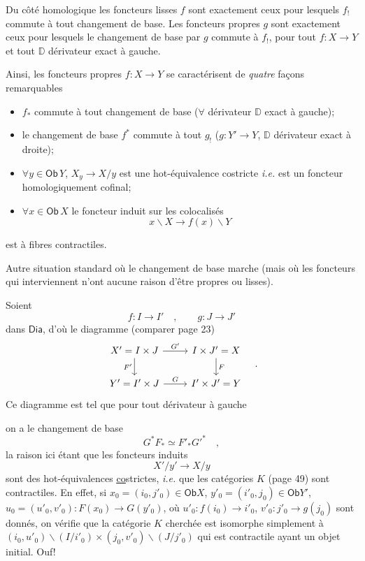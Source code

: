 \documentclass[11pt]{article}
\newcommand{\printedpage}[1]{\marginpar{\footnotesize p.~#1}}
\newcommand{\msp}[1]{\marginpar{\footnotesize [#1]}}
\newcommand{\Ob}{\mathsf{Ob}}
\newcommand{\Dia}{\mathsf{Dia}}
\newcommand{\DD}{\mathbb{D}}
\begin{document}
\noindent Du côté homologique les foncteurs lisses $f$ sont exactement ceux pour lesquels $f_!$ commute à tout changement de base. Les foncteurs propres $g$ sont exactement ceux pour lesquels le changement de base par $g$ commute à $f_!$, pour tout $f : X \to Y$ et tout $\DD$ dérivateur exact à gauche.

\noindent\msp{page 59}
Ainsi, les foncteurs propres $f : X \to Y$ se caractérisent de \textit{quatre} façons remarquables
\begin{itemize}[label={}, leftmargin=0pt, itemindent=2\parindent, labelsep=0.3em]
\item[\textit{a})] $f_*$ commute à tout changement de base ($\forall$ dérivateur $\DD$ exact à gauche);
\item[\textit{b})] le changement de base $f^*$ commute à tout $g_!$ ($g : Y' \to Y$, $\DD$ dérivateur exact à droite);
\item[\textit{c})] $\forall y \in \Ob\, Y$, $X_y \to X/y$ est une hot-équivalence costricte \textit{i.e.} est un foncteur homologiquement cofinal;
\item[\textit{d})] $\forall x \in \Ob\, X$ le foncteur induit sur les colocalisés
\[
x\backslash X \longrightarrow f(x)\backslash Y
\]
\end{itemize}

\printedpage{34}
\noindent est à fibres contractiles.

Autre situation standard où le changement de base marche (mais où les foncteurs qui interviennent n'ont aucune raison d'être propres ou lisses).

Soient
\[
f : I \longrightarrow I' \quad , \qquad g : J \longrightarrow J'
\]
dans $\Dia$, d'où le diagramme (comparer page 23)
\[
\begin{tikzcd}
X' = I \times J \arrow[r, "G'"] \arrow[d, "F'"'] & I \times J' = X \arrow[d, "F"] \\
Y' = I' \times J \arrow[r, "G"] & I' \times J' = Y
\end{tikzcd}
\quad .
\]
Ce diagramme est tel que pour tout dérivateur à gauche

\noindent\msp{page 60}

\noindent on a le changement de base
\[
G^*F_* \simeq F'_*{G'}^* \quad ,
\]
la raison ici étant que les foncteurs induits
\[
X'/y' \longrightarrow X/y
\]
sont des hot-équivalences \underline{\underline{co}}strictes, \textit{i.e.} que les catégories $K$ (page 49) sont contractiles. En effet, si $x_0 = (i_0, j'_0) \in \Ob X$, $y'_0 = (i'_0, j_0) \in \Ob Y'$, $u_0 = (u'_0, v'_0) : F(x_0) \to G(y'_0)$, où $u'_0 : f(i_0) \to i'_0$, $v'_0 : j'_0 \to g(j_0)$ sont donnés, on vérifie que la catégorie $K$ cherchée est isomorphe simplement à $(i_0, u'_0)\backslash(I/i'_0) \times (j_0, v'_0)\backslash(J/j'_0)$ qui est contractile ayant un objet initial. Ouf!
\end{document}
